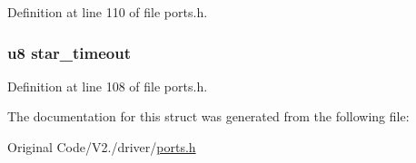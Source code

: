 \-Definition at line 110 of file ports.\-h.

\hypertarget{structstruct__button_a1b529be95d311858f31847dc3b73b7d1}{
\subsubsection[{star\-\_\-timeout}]{\setlength{\rightskip}{0pt plus 5cm}u8 {\bf star\-\_\-timeout}}}\label{structstruct__button_a1b529be95d311858f31847dc3b73b7d1}


\-Definition at line 108 of file ports.\-h.



\-The documentation for this struct was generated from the following file\-:\begin{DoxyCompactItemize}
\item 
\-Original Code/\-V2./driver/\hyperlink{ports_8h}{ports.\-h}\end{DoxyCompactItemize}

